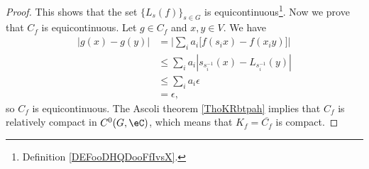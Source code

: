 \begin{proof}
	This shows that the set \( \{ L_s(f) \}_{s\in G}\) is equicontinuous\footnote{Definition \ref{DEFooDHQDooFfIvsX}.}. Now we prove that \( C_f\) is equicontinuous. Let \( g\in C_f\) and \( x,y\in V\). We have
	\begin{subequations}
		\begin{align}
			| g(x)-g(y) | & =\Big|   \sum_ia_i\big[ f(s_ix)-f(x_iy) \big]   \Big| \\
			              & \leq \sum_ia_i| s_{s_i^{-1}}(x)-L_{s_i^{-1}}(y) |     \\
			              & \leq \sum_ia_i\epsilon                                \\
			              & =\epsilon,
		\end{align}
	\end{subequations}
	so \( C_f\) is equicontinuous. The Ascoli theorem \ref{ThoKRbtpah} implies that \( C_f\) is relatively compact in \( C^0(G,\eC)\), which means that \( K_f=\overline{ C_f }\) is compact.


\end{proof}
